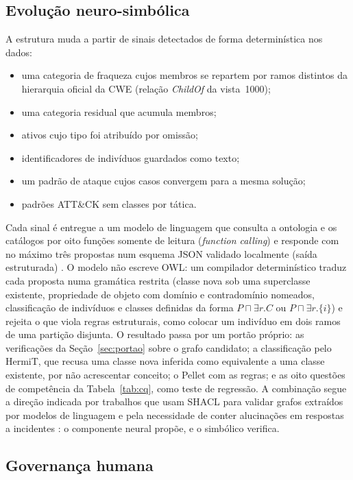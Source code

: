 \subsection{Evolução neuro-simbólica}

A estrutura muda a partir de sinais detectados de forma determinística nos dados:
\begin{itemize}
\item uma categoria de fraqueza cujos membros se repartem por ramos distintos da hierarquia oficial da CWE (relação \emph{ChildOf} da vista~1000);
\item uma categoria residual que acumula membros;
\item ativos cujo tipo foi atribuído por omissão;
\item identificadores de indivíduos guardados como texto;
\item um padrão de ataque cujos casos convergem para a mesma solução;
\item padrões ATT\&CK sem classes por tática.
\end{itemize}
Cada sinal é entregue a um modelo de linguagem que consulta a ontologia e os catálogos por oito funções somente de leitura (\emph{function calling}) e responde com no máximo três propostas num esquema JSON validado localmente (saída estruturada) \cite{geminiapi}. O modelo não escreve OWL: um compilador determinístico traduz cada proposta numa gramática restrita (classe nova sob uma superclasse existente, propriedade de objeto com domínio e contradomínio nomeados, classificação de indivíduos e classes definidas da forma $P \sqcap \exists r.C$ ou $P \sqcap \exists r.\{i\}$) e rejeita o que viola regras estruturais, como colocar um indivíduo em dois ramos de uma partição disjunta. O resultado passa por um portão próprio: as verificações da Seção~\ref{sec:portao} sobre o grafo candidato; a classificação pelo HermiT, que recusa uma classe nova inferida como equivalente a uma classe existente, por não acrescentar conceito; o Pellet com as regras; e as oito questões de competência da Tabela~\ref{tab:cq}, como teste de regressão. A combinação segue a direção indicada por trabalhos que usam SHACL para validar grafos extraídos por modelos de linguagem \cite{cotti2026ontologx} e pela necessidade de conter alucinações em respostas a incidentes \cite{hammar2026}: o componente neural propõe, e o simbólico verifica.

\subsection{Governança humana}

